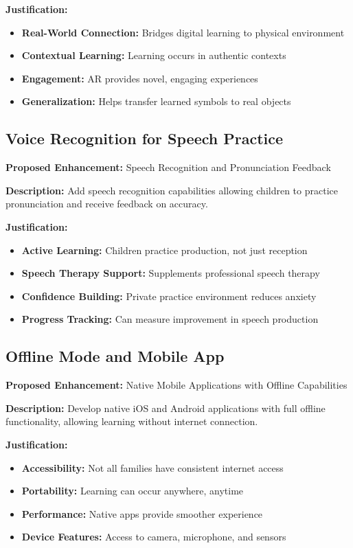 \documentclass[12pt,a4paper]{article}
\begin{document}
\textbf{Justification:}
\begin{itemize}
    \item \textbf{Real-World Connection:} Bridges digital learning to physical environment
    \item \textbf{Contextual Learning:} Learning occurs in authentic contexts
    \item \textbf{Engagement:} AR provides novel, engaging experiences
    \item \textbf{Generalization:} Helps transfer learned symbols to real objects
\end{itemize}

\subsection{Voice Recognition for Speech Practice}
\textbf{Proposed Enhancement:} Speech Recognition and Pronunciation Feedback

\textbf{Description:}
Add speech recognition capabilities allowing children to practice pronunciation and receive feedback on accuracy.

\textbf{Justification:}
\begin{itemize}
    \item \textbf{Active Learning:} Children practice production, not just reception
    \item \textbf{Speech Therapy Support:} Supplements professional speech therapy
    \item \textbf{Confidence Building:} Private practice environment reduces anxiety
    \item \textbf{Progress Tracking:} Can measure improvement in speech production
\end{itemize}

\subsection{Offline Mode and Mobile App}
\textbf{Proposed Enhancement:} Native Mobile Applications with Offline Capabilities

\textbf{Description:}
Develop native iOS and Android applications with full offline functionality, allowing learning without internet connection.

\textbf{Justification:}
\begin{itemize}
    \item \textbf{Accessibility:} Not all families have consistent internet access
    \item \textbf{Portability:} Learning can occur anywhere, anytime
    \item \textbf{Performance:} Native apps provide smoother experience
    \item \textbf{Device Features:} Access to camera, microphone, and sensors
\end{itemize}
\end{document}
